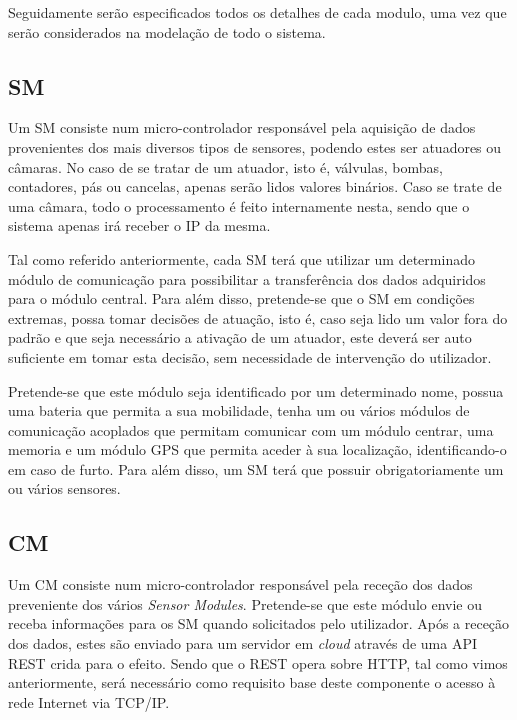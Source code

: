Seguidamente serão especificados todos os detalhes de cada modulo, uma vez que serão considerados na modelação de todo o sistema. 



\subsection{\acl{SM}}



Um \acl{SM} consiste num micro-controlador responsável pela aquisição de dados provenientes dos mais diversos tipos de sensores, podendo estes ser atuadores ou câmaras. No caso de se tratar de um atuador, isto é, válvulas, bombas, contadores, pás ou cancelas, apenas serão lidos valores binários. Caso se trate de uma câmara, todo o processamento é feito internamente nesta, sendo que o sistema apenas irá receber o IP da mesma. 


Tal como referido anteriormente, cada \acl{SM} terá que utilizar um determinado módulo de comunicação para possibilitar a transferência dos dados adquiridos para o módulo central. Para além disso, pretende-se que o \acl{SM} em condições extremas, possa tomar decisões de atuação, isto é, caso seja lido um valor fora do padrão e que seja necessário a ativação de um atuador, este deverá ser auto suficiente em tomar esta decisão, sem necessidade de intervenção do utilizador. 

Pretende-se que este módulo seja identificado por um determinado nome, possua uma bateria que permita a sua mobilidade, tenha um ou vários módulos de comunicação acoplados que permitam comunicar com um módulo centrar, uma memoria e um módulo \ac{GPS} que permita aceder à sua localização, identificando-o em caso de furto. Para além disso, um \acl{SM} terá que possuir obrigatoriamente um ou vários sensores.








\subsection{\acl{CM}}



Um \acl{CM} consiste num micro-controlador responsável pela receção dos dados preveniente dos vários \textit{Sensor Modules}. Pretende-se que este módulo envie ou receba informações para os \acl{SM} quando solicitados pelo utilizador. Após a receção dos dados, estes são enviado para um servidor em \textit{cloud} através de uma API REST crida para o efeito. Sendo que o REST opera sobre HTTP, tal como vimos anteriormente, será necessário como requisito base deste componente o acesso à rede Internet via TCP/IP. 

